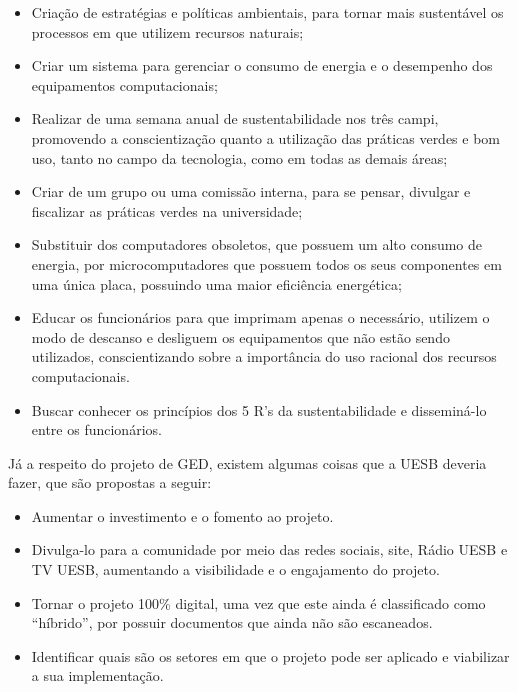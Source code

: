 \begin{itemize}
\item Criação de estratégias e políticas ambientais, para tornar mais sustentável os processos em que utilizem recursos naturais;
\item Criar um sistema para gerenciar o consumo de energia e o desempenho dos equipamentos computacionais;
\item Realizar de uma semana anual de sustentabilidade nos três campi,  promovendo a conscientização quanto a utilização das práticas verdes e bom uso, tanto no campo da tecnologia, como em todas as demais áreas;
\item Criar de um grupo ou uma comissão interna, para se pensar, divulgar e fiscalizar as práticas verdes na universidade;
\item Substituir dos computadores obsoletos, que possuem um alto consumo de energia, por microcomputadores que possuem todos os seus componentes em uma única placa, possuindo uma maior eficiência energética;
\item Educar os funcionários para que imprimam apenas o necessário, utilizem o modo de descanso e desliguem os equipamentos que não estão sendo utilizados, conscientizando sobre a importância do uso racional dos recursos computacionais. 
\item Buscar conhecer os princípios dos 5 R's da sustentabilidade e disseminá-lo entre os funcionários.
\end{itemize}

Já a respeito do projeto de GED, existem algumas coisas que a UESB deveria fazer, que são propostas a seguir: 

\begin{itemize}
\item Aumentar o investimento e o fomento ao projeto.
\item Divulga-lo para a comunidade por meio das redes sociais, site, Rádio UESB e TV UESB, aumentando a visibilidade e o engajamento do projeto.
\item Tornar o projeto 100\% digital, uma vez que este ainda é classificado como ``híbrido'', por possuir documentos que ainda não são escaneados.
\item Identificar quais são os setores em que o projeto pode ser aplicado e viabilizar a sua implementação.
\end{itemize}
